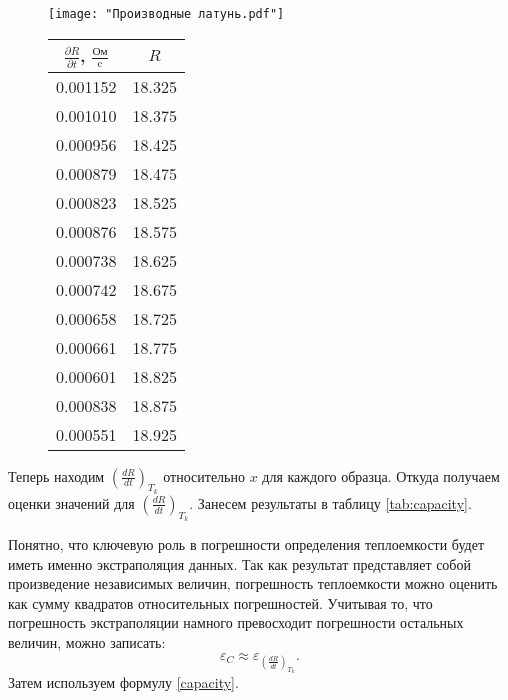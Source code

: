 \documentclass[12pt,a4paper]{article}
\begin{document}
\begin{figure}\CenterFloatBoxes
	\begin{floatrow}
		{
			
			\texttt{[image: "Производные латунь.pdf"]}
			
		}
		\killfloatstyle{}
		{	\footnotesize
			\begin{tabular}{|c|c|}
				
				\hline
				$\frac{\partial R}{\partial t}$, $\frac{\text{Ом}}{\text{c}}$ &        $R$ \text{Ом}\\ \hline
				0.001152 & 18.325 \\ \hline
				0.001010 & 18.375\\ \hline
				0.000956 & 18.425 \\ \hline
				0.000879 & 18.475 \\ \hline
				0.000823 & 18.525 \\ \hline
				0.000876 & 18.575 \\ \hline
				0.000738 & 18.625 \\ \hline
				0.000742 & 18.675 \\ \hline
				0.000658 & 18.725 \\ \hline
				0.000661 & 18.775 \\ \hline
				0.000601 & 18.825 \\ \hline
				0.000838 & 18.875 \\ \hline
				0.000551 & 18.925 \\ \hline
			\end{tabular}
			
		}
	\end{floatrow}
\end{figure}
Теперь находим $\left(\frac{dR}{dt}\right)_{T_k}$ относительно $x$ для каждого образца. 
Откуда получаем оценки значений для $\left(\frac{dR}{dt}\right)_{T_k}$.  Занесем результаты в таблицу \ref{tab:capacity}.


Понятно, что ключевую роль в погрешности определения теплоемкости будет иметь именно экстраполяция данных.
Так как результат представляет собой произведение независимых величин, погрешность теплоемкости можно оценить как сумму квадратов относительных погрешностей. Учитывая то, что погрешность экстраполяции намного превосходит погрешности остальных величин, можно записать:
$$\varepsilon_C \approx \varepsilon_{\left(\frac{dR}{dt}\right)_{T_k}}.$$
Затем используем формулу \ref{capacity}.
\end{document}

